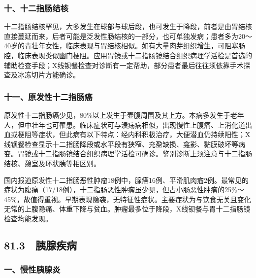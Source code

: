 \subsubsection{十、十二指肠结核}

十二指肠结核罕见，大多发生在球部与球后段，也可发生于降段，前者是由胃结核直接蔓延而来，后者可能是泛发性肠结核的一部分，也可单独发病；患者多为20～40岁的青壮年女性，临床表现与胃结核相似。如有大量肉芽组织增生，可阻塞肠腔，临床表现类似幽门梗阻。应用胃镜或十二指肠镜结合组织病理学活检是首选的辅助检查手段；X线钡餐检查对诊断有一定帮助，部分患者最后往往须依靠手术探查及冰冻切片方能确诊。

\subsubsection{十一、原发性十二指肠癌}

原发性十二指肠癌少见，80\%以上发生于壶腹周围及其上方。本病多发生于老年人，但中壮年也可罹患。临床症状可与溃疡病相似，出现慢性上腹痛、上消化道出血或梗阻等症状，但此病有以下特点：经内科积极治疗，大便潜血仍持续阳性；X线钡餐检查显示十二指肠降段或水平段有狭窄、充盈缺损、龛影、黏膜破坏等病变。胃镜或十二指肠镜结合组织病理学活检可确诊。鉴别诊断上须注意与十二指肠结核、憩室及环状胰等相区别。

国内报道原发性十二指肠恶性肿瘤18例中，腺癌16例、平滑肌肉瘤2例。最常见的症状为腹痛（17/18例），十二指肠恶性肿瘤虽少见，但占小肠恶性肿瘤的25\%～45\%，故值得重视。早期表现隐袭，无特征性症状。主要症状为与饮食无关且变化无常的上腹隐痛、体重下降与贫血。肿瘤最多位于降段，X线钡餐与胃十二指肠镜检查均能发现。

\subsection{81.3　胰腺疾病}

\subsubsection{一、慢性胰腺炎}

